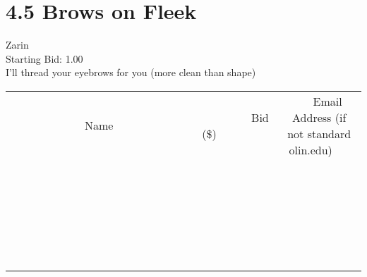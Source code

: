 \documentclass[11pt]{article}
\begin{document}
					\section*{4.5 Brows on Fleek}
					Zarin \\
					Starting Bid: 1.00 \\
					I'll thread your eyebrows for you (more clean than shape) \\
					[6ex]
					\begin{tabular}{c c c}
						~~~~~~~~~~~~~Name~~~~~~~~~~~~~ & ~~~~~~~~~Bid (\$)~~~~~~~~~ & ~~~Email Address (if not standard olin.edu)~~~ \\
				
 & & \\
\hline
 & & \\
\hline
 & & \\
\hline
 & & \\
\hline
 & & \\
\hline
 & & \\
\hline
 & & \\
\hline
 & & \\
\hline
 & & \\
\hline
 & & \\
\hline
 & & \\
\hline
 & & \\
\hline
 & & \\
\hline
 & & \\
\hline
 & & \\
\hline
 & & \\
\hline
 & & \\
\hline
 & & \\
\hline
 & & \\
\hline
 & & \\
\hline
 & & \\
\hline
 & & \\
\hline
 & & \\
\hline
 & & \\
\hline
 & & \\
\hline
 & & \\
\hline
					\end{tabular}
					\clearpage
				
\end{document}
